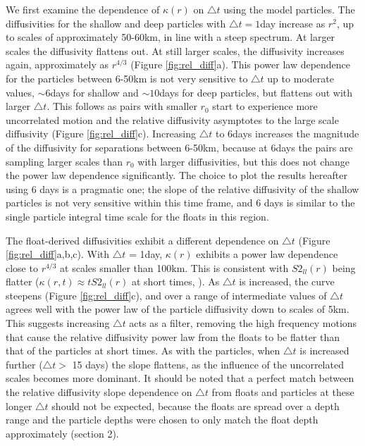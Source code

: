 \documentclass[]{ametsoc}
\begin{document}
We first examine the dependence of $\kappa(r)$ on $\triangle t$ using the model particles.
The diffusivities for the shallow and deep particles with $\triangle t = 1$day increase as $r^2$, up to scales of approximately 50-60km, in line with a steep spectrum. At larger scales the diffusivity flattens out. At still larger scales, the diffusivity increases again, approximately as $r^{4/3}$ (Figure \ref{fig:rel_diff}a). 
This power law dependence for the particles between 6-50km is not very sensitive to $\triangle t$ up to moderate values, $\sim6$days for shallow and $\sim10$days for deep particles, but flattens out with larger $\triangle t$. This follows as pairs with smaller $r_0$ start to experience more uncorrelated motion and the relative diffusivity asymptotes to the large scale diffusivity (Figure \ref{fig:rel_diff}c). 
Increasing $\triangle t$ to 6days increases the magnitude of the diffusivity for separations between 6-50km, because at 6days the pairs are sampling larger scales than $r_0$ with larger diffusivities, but this does not change the power law dependence significantly. The choice to plot the results hereafter using 6 days is a pragmatic one; the slope of the relative diffusivity of the shallow particles is not very sensitive within this time frame, and 6 days is similar to the single particle integral time scale for the floats in this region.

The float-derived diffusivities exhibit a different dependence on $\triangle t$ (Figure \ref{fig:rel_diff}a,b,c). With $\triangle t$ = 1day, $\kappa (r)$ exhibits a power law dependence close to $r^{4/3}$ at scales smaller than 100km. This is consistent with $S2_{ll}(r)$ being flatter ($\kappa(r,t) \approx tS2_{ll}(r)$ at short times, \citet{babiano1990relative}). As $\triangle t$ is increased, the curve steepens (Figure \ref{fig:rel_diff}c), and over a range of intermediate values of $\triangle t$ agrees well with the power law of the particle diffusivity down to scales of 5km.
This suggests increasing $\triangle t$ acts as a filter, removing the high frequency motions that cause the relative diffusivity power law from the floats to be flatter than that of the particles at short times.
As with the particles, when $\triangle t$ is increased further ($\triangle t>$ 15 days) the slope flattens, as the influence of the uncorrelated scales becomes more dominant. It should be noted that a perfect match between the relative diffusivity slope dependence on $\triangle t$ from floats and particles at these longer $\triangle t$ should not be expected, because the floats are spread over a depth range and the particle depths were chosen to only match the float depth approximately (section 2).
\end{document}
